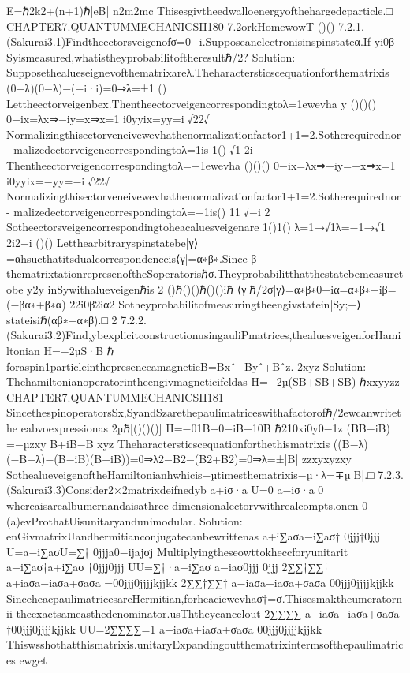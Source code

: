 {{{{{{{{{{E=ℏ2k2+(n+1)ℏ|eB|
n2m2mc
Thisesgivtheedwalloenergyofthehargedcparticle.□
CHAPTER7.QUANTUMMECHANICSII180
7.2orkHomewowT
()()
7.2.1.(Sakurai3.1)Findtheectorsveigenofσ=0−i.Supposeanelectronisinspinstateα.If
yi0β
Syismeasured,whatistheyprobabilitoftheresultℏ/2?
Solution:
Supposethealueseignevofthematrixareλ.Theharactersticscequationforthematrixis
(0−λ)(0−λ)−(−i·i)=0⇒λ=±1
()
Lettheectorveigenbex.Thentheectorveigencorrespondingtoλ=1ewevha
y
()()()
0−ix=λx⇒−iy=x⇒x=1
i0yyix=yy=i
√22√
Normalizingthisectorveneivewevhathenormalizationfactor1+1=2.Sotherequirednor-
malizedectorveigencorrespondingtoλ=1is
1()
√1
2i
Thentheectorveigencorrespondingtoλ=−1ewevha
()()()
0−ix=λx⇒−iy=−x⇒x=1
i0yyix=−yy=−i
√22√
Normalizingthisectorveneivewevhathenormalizationfactor1+1=2.Sotherequirednor-
malizedectorveigencorrespondingtoλ=−1is()
11
√−i
2
Sotheectorsveigencorrespondingtoheacaluesveigenare
1()1()
λ=1→√1λ=−1→√1
2i2−i
()()
Letthearbitraryspinstatebe|γ⟩=αhsucthatitsdualcorrespondenceis⟨γ|=α∗β∗.Since
β
thematrixtationrepresenoftheSoperatorisℏσ.Theyprobabilitthatthestatebemeasuretobe
y2y
inSywithalueveigenℏis
2
()ℏ()()ℏ()()iℏ
⟨γ|ℏ/2σ|γ⟩=α∗β∗0−iα=α∗β∗−iβ=(−βα∗+β∗α)
22i0β2iα2
Sotheyprobabilitofmeasuringtheengivstatein|Sy;+⟩stateisiℏ(αβ∗−α∗β).□
2
7.2.2.(Sakurai3.2)Find,ybexplicitconstructionusingauliPmatrices,thealuesveigenforHamiltonian
H=−2µS·B
ℏ
foraspin1particleinthepresenceamagneticB=Bxˆ+Byˆ+Bˆz.
2xyz
Solution:
Thehamiltonianoperatorintheengivmagneticifeldas
H=−2µ(SB+SB+SB)
ℏxxyyzz
CHAPTER7.QUANTUMMECHANICSII181
SincethespinoperatorsSx,SyandSzarethepaulimatriceswithafactorofℏ/2ewcanwritethe
eabvoexpressionas
2µℏ[()()()]
H=−01B+0−iB+10B
ℏ210xi0y0−1z
(BB−iB)
=−µzxy
B+iB−B
xyz
Theharactersticscequationforthethismatrixis
((B−λ)(−B−λ)−(B−iB)(B+iB))=0⇒λ2−B2−(B2+B2)=0⇒λ=±|B|
zzxyxyzxy
SothealueveigenoftheHamiltonianhwhicis−µtimesthematrixis−µ·λ=∓µ|B|.□
7.2.3.(Sakurai3.3)Consider2×2matrixdeifnedyb
a+iσ·a
U=0
a−iσ·a
0
whereaisarealbumernandaisathree-dimensionalectorvwithrealcompts.onen
0
(a)evProthatUisunitaryandunimodular.
Solution:
enGivmatrixUandhermitianconjugatecanbewrittenas
a+i∑aσa−i∑aσ†
0jjj†0jjj
U=a−i∑aσU=∑†
0jjja0−ijajσj
Multiplyingtheseowttokheccforyunitarit
a−i∑aσ†a+i∑aσ
†0jjj0jjj
UU=∑†·a−i∑aσ
a−iaσ0jjj
0jjj
2∑∑†∑∑†
a+iaσa−iaσa+σaσa
=00jjj0jjjjkjjkk
2∑∑†∑∑†
a−iaσa+iaσa+σaσa
00jjj0jjjjkjjkk
SinceheacpaulimatricesareHermitian,forheaciewevhaσ†=σ.Thisesmaktheumeratorn
ii
theexactsameasthedenominator.usThtheycancelout
2∑∑∑∑
a+iaσa−iaσa+σaσa
†00jjj0jjjjkjjkk
UU=2∑∑∑∑=1
a−iaσa+iaσa+σaσa
00jjj0jjjjkjjkk
Thiswsshothatthismatrixis.unitaryExpandingoutthematrixintermsofthepaulimatrices
ewget
}}}}}}}}}}
